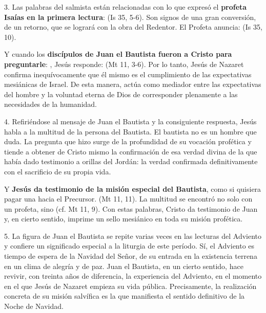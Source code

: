\begin{body}
\begin{body}
3. Las palabras del salmista están relacionadas con lo que expresó el \textbf{profeta Isaías en la primera lectura}:  (Is 35, 5-6). Son signos de una gran conversión, de un retorno, que se logrará con la obra del Redentor. El Profeta anuncia:  (Is 35, 10).

Y cuando los \textbf{discípulos de Juan el Bautista fueron a Cristo para preguntarle}: , Jesús responde:  (Mt 11, 3-6). Por lo tanto, Jesús de Nazaret confirma inequívocamente que él mismo es el cumplimiento de las expectativas mesiánicas de Israel. De esta manera, actúa como mediador entre las expectativas del hombre y la voluntad eterna de Dios de corresponder plenamente a las necesidades de la humanidad.

4. Refiriéndose al mensaje de Juan el Bautista y la consiguiente respuesta, Jesús habla a la multitud de la persona del Bautista. El bautista no es un hombre que duda. La pregunta que hizo surge de la profundidad de su vocación profética y tiende a obtener de Cristo mismo la confirmación de esa verdad divina de la que había dado testimonio a orillas del Jordán: la verdad confirmada definitivamente con el sacrificio de su propia vida.

Y \textbf{Jesús da testimonio de la misión especial del Bautista}, como si quisiera pagar una  hacia el Precursor.  (Mt 11, 11). La multitud se encontró no solo con un profeta, sino  (cf. Mt 11, 9). Con estas palabras, Cristo da testimonio de Juan y, en cierto sentido, imprime un sello mesiánico en toda su misión profética.

5. La figura de Juan el Bautista se repite varias veces en las lecturas del Adviento y confiere un significado especial a la liturgia de este período. Sí, el Adviento es tiempo de espera de la Navidad del Señor, de su entrada en la existencia terrena en un clima de alegría y de paz. Juan el Bautista, en un cierto sentido, hace revivir, con treinta años de diferencia, la experiencia del Adviento, en el momento en el que Jesús de Nazaret empieza su vida pública. Precisamente, la realización concreta de su misión salvífica es la que manifiesta el sentido definitivo de la Noche de Navidad.


\end{body}
\end{body}
